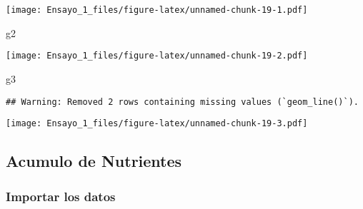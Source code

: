 \documentclass[
]{article}
\newenvironment{Shaded}{\begin{snugshade}}{\end{snugshade}}
\newcommand{\NormalTok}[1]{#1}
\begin{document}
\texttt{[image: Ensayo\_1\_files/figure-latex/unnamed-chunk-19-1.pdf]}

\begin{Shaded}
\begin{Highlighting}[]
\NormalTok{g2}
\end{Highlighting}
\end{Shaded}

\texttt{[image: Ensayo\_1\_files/figure-latex/unnamed-chunk-19-2.pdf]}

\begin{Shaded}
\begin{Highlighting}[]
\NormalTok{g3}
\end{Highlighting}
\end{Shaded}

\begin{verbatim}
## Warning: Removed 2 rows containing missing values (`geom_line()`).
\end{verbatim}

\texttt{[image: Ensayo\_1\_files/figure-latex/unnamed-chunk-19-3.pdf]}

\hypertarget{acumulo-de-nutrientes}{%
\subsection{Acumulo de Nutrientes}\label{acumulo-de-nutrientes}}

\hypertarget{importar-los-datos}{%
\subsubsection{Importar los datos}\label{importar-los-datos}}
\end{document}
